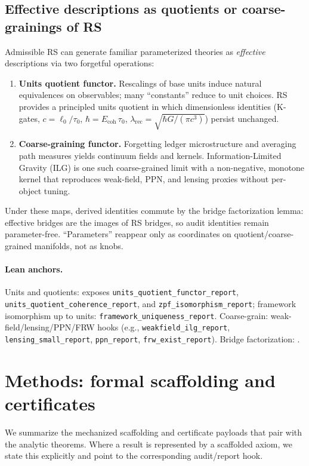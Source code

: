 \documentclass[11pt]{article}
\begin{document}
\subsection{Effective descriptions as quotients or coarse\mbox{-}grainings of RS}
Admissible RS can generate familiar parameterized theories as \emph{effective} descriptions via two forgetful operations:
\begin{enumerate}
  \item \textbf{Units quotient functor.} Rescalings of base units induce natural equivalences on observables; many ``constants'' reduce to unit choices. RS provides a principled units quotient in which dimensionless identities (K\mbox{-}gates, \(c=\ell_0/\tau_0\), \(\hbar=E_{\mathrm{coh}}\,\tau_0\), \(\lambda_{\mathrm{rec}}=\sqrt{\hbar G/(\pi c^3)}\)) persist unchanged.
  \item \textbf{Coarse\mbox{-}graining functor.} Forgetting ledger microstructure and averaging path measures yields continuum fields and kernels. Information\mbox{-}Limited Gravity (ILG) is one such coarse\mbox{-}grained limit with a non\mbox{-}negative, monotone kernel that reproduces weak\mbox{-}field, PPN, and lensing proxies without per\mbox{-}object tuning.
\end{enumerate}
Under these maps, derived identities commute by the bridge factorization lemma: effective bridges are the images of RS bridges, so audit identities remain parameter\mbox{-}free. ``Parameters'' reappear only as coordinates on quotient/coarse\mbox{-}grained manifolds, not as knobs.

\paragraph{Lean anchors.} Units and quotients:  exposes \texttt{units\_quotient\_functor\_report}, \texttt{units\_quotient\_coherence\_report}, and \texttt{zpf\_isomorphism\_report}; framework isomorphism up to units: \texttt{framework\_uniqueness\_report}. Coarse\mbox{-}grain: weak\mbox{-}field/lensing/PPN/FRW hooks (e.g., \texttt{weakfield\_ilg\_report}, \texttt{lensing\_small\_report}, \texttt{ppn\_report}, \texttt{frw\_exist\_report}). Bridge factorization: .

\section{Methods: formal scaffolding and certificates}
We summarize the mechanized scaffolding and certificate payloads that pair with the analytic theorems. Where a result is represented by a scaffolded axiom, we state this explicitly and point to the corresponding audit/report hook.
\end{document}

